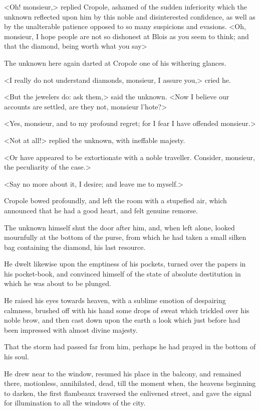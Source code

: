 <Oh! monsieur,> replied Cropole, ashamed of the sudden inferiority which the unknown reflected upon him by this noble and disinterested confidence, as well as by the unalterable patience opposed to so many suspicions and evasions. <Oh, monsieur, I hope people are not so dishonest at Blois as you seem to think; and that the diamond, being worth what you say\longdash>

The unknown here again darted at Cropole one of his withering glances.

<I really do not understand diamonds, monsieur, I assure you,> cried he.

<But the jewelers do: ask them,> said the unknown. <Now I believe our accounts are settled, are they not, monsieur l'hote?>

<Yes, monsieur, and to my profound regret; for I fear I have offended monsieur.>

<Not at all!> replied the unknown, with ineffable majesty.

<Or have appeared to be extortionate with a noble traveller. Consider, monsieur, the peculiarity of the case.>

<Say no more about it, I desire; and leave me to myself.>

Cropole bowed profoundly, and left the room with a stupefied air, which announced that he had a good heart, and felt genuine remorse.

The unknown himself shut the door after him, and, when left alone, looked mournfully at the bottom of the purse, from which he had taken a small silken bag containing the diamond, his last resource.

He dwelt likewise upon the emptiness of his pockets, turned over the papers in his pocket-book, and convinced himself of the state of absolute destitution in which he was about to be plunged.

He raised his eyes towards heaven, with a sublime emotion of despairing calmness, brushed off with his hand some drops of sweat which trickled over his noble brow, and then cast down upon the earth a look which just before had been impressed with almost divine majesty.

That the storm had passed far from him, perhaps he had prayed in the bottom of his soul.

He drew near to the window, resumed his place in the balcony, and remained there, motionless, annihilated, dead, till the moment when, the heavens beginning to darken, the first flambeaux traversed the enlivened street, and gave the signal for illumination to all the windows of the city. 